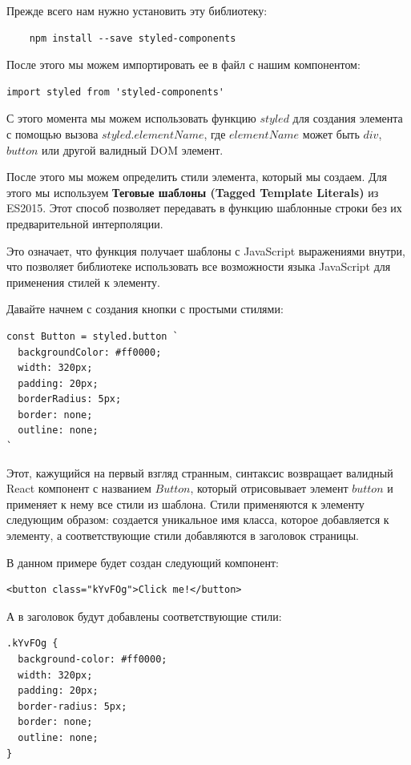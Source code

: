 Прежде всего нам нужно установить эту библиотеку:

\begin{lstlisting}
	npm install --save styled-components
\end{lstlisting}

После этого мы можем импортировать ее в файл с нашим компонентом:

\begin{lstlisting}
import styled from 'styled-components'
\end{lstlisting}

С этого момента мы можем использовать функцию $styled$ для создания элемента с помощью вызова $styled.elementName$, где $elementName$ может быть $div$, $button$ или другой валидный DOM элемент.

После этого мы можем определить стили элемента, который мы создаем. Для этого мы используем \textbf{Теговые шаблоны (Tagged Template Literals)} из ES2015. Этот способ позволяет передавать в функцию шаблонные строки без их предварительной интерполяции.

Это означает, что функция получает шаблоны с JavaScript выражениями внутри, что позволяет библиотеке использовать все возможности языка JavaScript для применения стилей к элементу.

Давайте начнем с создания кнопки с простыми стилями:

\begin{lstlisting}
const Button = styled.button `
  backgroundColor: #ff0000;
  width: 320px;
  padding: 20px;
  borderRadius: 5px;
  border: none;
  outline: none;
`
\end{lstlisting}

Этот, кажущийся на первый взгляд странным, синтаксис возвращает валидный React компонент с названием $Button$, который отрисовывает элемент $button$ и применяет к нему все стили из шаблона. Стили применяются к элементу следующим образом: создается уникальное имя класса, которое добавляется к элементу, а соответствующие стили добавляются в заголовок страницы.

В данном примере будет создан следующий компонент:

\begin{lstlisting}
<button class="kYvFOg">Click me!</button>
\end{lstlisting}

А в заголовок будут добавлены соответствующие стили:

\begin{lstlisting}
.kYvFOg {
  background-color: #ff0000;
  width: 320px;
  padding: 20px;
  border-radius: 5px;
  border: none;
  outline: none;
}
\end{lstlisting}

